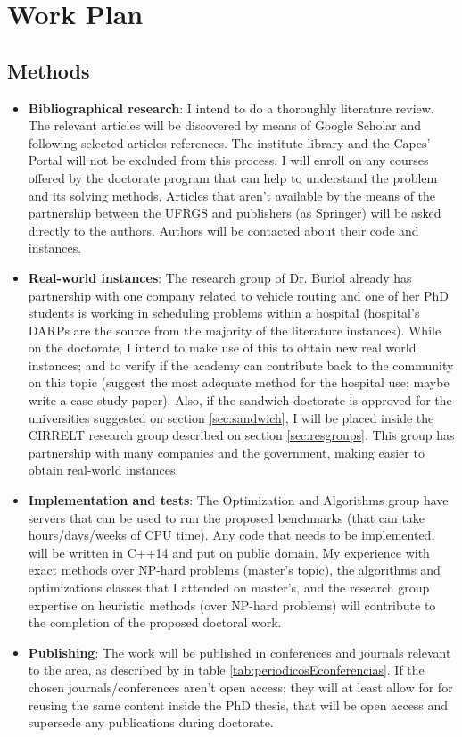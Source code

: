 \documentclass[english,plano-doutorado,twoside]{iiufrgs}
\begin{document}
\section{Work Plan}

\subsection{Methods}

\begin{itemize}
\item \textbf{Bibliographical research}: I intend to do a thoroughly literature review. The relevant articles will be discovered by means of Google Scholar and following selected articles references. The institute library and the Capes' Portal will not be excluded from this process. I will enroll on any courses offered by the doctorate program that can help to understand the problem and its solving methods. Articles that aren't available by the means of the partnership between the UFRGS and publishers (as Springer) will be asked directly to the authors. Authors will be contacted about their code and instances.
\item \textbf{Real-world instances}: The research group of Dr. Buriol already has partnership with one company related to vehicle routing and one of her PhD students is working in scheduling problems within a hospital (hospital's DARPs are the source from the majority of the literature instances). While on the doctorate, I intend to make use of this to obtain new real world instances; and to verify if the academy can contribute back to the community on this topic (suggest the most adequate method for the hospital use; maybe write a case study paper). Also, if the sandwich doctorate is approved for the universities suggested on section \ref{sec:sandwich}, I will be placed inside the CIRRELT research group described on section \ref{sec:resgroups}. This group has partnership with many companies and the government, making easier to obtain real-world instances.
\item \textbf{Implementation and tests}: The Optimization and Algorithms group have servers that can be used to run the proposed benchmarks (that can take hours/days/weeks of CPU time). Any code that needs to be implemented, will be written in C++14 and put on public domain. My experience with exact methods over NP-hard problems (master's topic), the algorithms and optimizations classes that I attended on master's, and the research group expertise on heuristic methods (over NP-hard problems) will contribute to the completion of the proposed doctoral work.
\item \textbf{Publishing}: The work will be published in conferences and journals relevant to the area, as described by in table \ref{tab:periodicosEconferencias}. If the chosen journals/conferences aren't open access; they will at least allow for for reusing the same content inside the PhD thesis, that will be open access and supersede any publications during doctorate.
\end{itemize}
\end{document}
